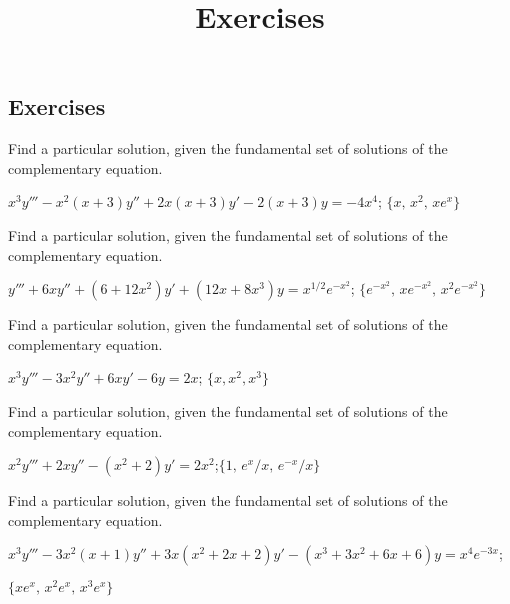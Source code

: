 \documentclass{ximera}
\title{Exercises} \license{CC BY-NC-SA 4.0}
\begin{document}
\begin{abstract}
\end{abstract}
\maketitle

\begin{onlineOnly}
\section*{Exercises}
\end{onlineOnly}

\begin{problem}\label{exer:9.4.1}
Find a particular
solution, given the fundamental set of solutions of the complementary equation.

$x^3y'''-x^2(x+3)y''+2x(x+3)y'-2(x+3)y=-4x^4$;\quad
$\{x,\,x^2,\,xe^x\}$
\newpage
\end{problem}

\begin{problem}\label{exer:9.4.2}
Find a particular solution, given the fundamental set of solutions of the complementary equation.

$y'''+6xy''+(6+12x^2)y'+(12x+8x^3)y=x^{1/2}e^{-x^2}$;\quad
 $\{e^{-x^2},\,xe^{-x^2},\,x^2e^{-x^2}\}$
\end{problem}


\begin{problem}\label{exer:9.4.3} 
Find a particular
solution, given the fundamental set of solutions of the complementary equation.

$x^3y'''-3x^2y''+6xy'-6y=2x$;
 \quad  $\{x,x^2,x^3\}$
\end{problem}

\begin{problem}\label{exer:9.4.4}
Find a particular
solution, given the fundamental set of solutions of the complementary equation.

$x^2y'''+2xy''-(x^2+2)y'=2x^2$;\quad   $\{1,\,e^x/x,\,e^{-x}/x\}$
\end{problem}

\begin{problem}\label{exer:9.4.5}
Find a particular
solution, given the fundamental set of solutions of the complementary equation.

$x^3y'''-3x^2(x+1)y''+3x(x^2+2x+2)y'-(x^3+3x^2+6x+6)y=x^4e^{-3x}$;\quad

$\{xe^x,\,x^2e^x,\,x^3e^x\}$
\end{problem}
\end{document}
